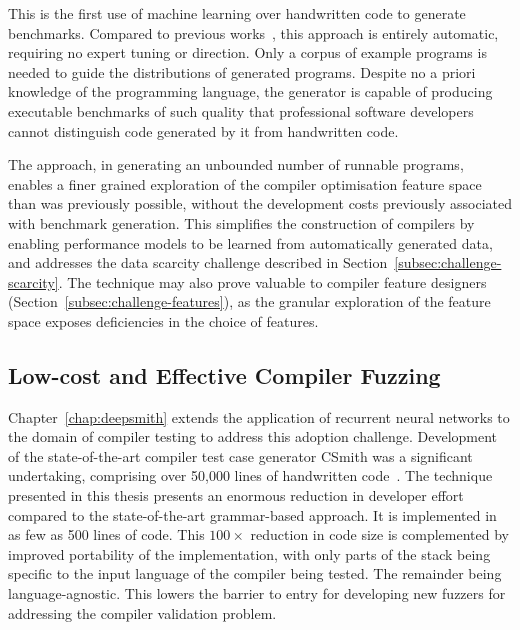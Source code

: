 This is the first use of machine learning over handwritten code to generate benchmarks. Compared to previous works~\cite{Chiu2015}, this approach is entirely automatic, requiring no expert tuning or direction. Only a corpus of example programs is needed to guide the distributions of generated programs. Despite no a priori knowledge of the programming language, the generator is capable of producing executable benchmarks of such quality that professional software developers cannot distinguish code generated by it from handwritten code.

The approach, in generating an unbounded number of runnable programs, enables a finer grained exploration of the compiler optimisation feature space than was previously possible, without the development costs previously associated with benchmark generation. This simplifies the construction of compilers by enabling performance models to be learned from automatically generated data, and addresses the data scarcity challenge described in Section~\ref{subsec:challenge-scarcity}. The technique may also prove valuable to compiler feature designers (Section~\ref{subsec:challenge-features}), as the granular exploration of the feature space exposes deficiencies in the choice of features.



\subsection{Low-cost and Effective Compiler Fuzzing}

 Chapter~\ref{chap:deepsmith} extends the application of recurrent neural networks to the domain of compiler testing to address this adoption challenge. Development of the state-of-the-art compiler test case generator CSmith was a significant undertaking, comprising over 50,000 lines of handwritten code~\cite{Yang2011,Lidbury2015a}. The technique presented in this thesis presents an enormous reduction in developer effort compared to the state-of-the-art grammar-based approach. It is implemented in as few as 500 lines of code. This $100\times$ reduction in code size is complemented by improved portability of the implementation, with only parts of the stack being specific to the input language of the compiler being tested. The remainder being language-agnostic. This lowers the barrier to entry for developing new fuzzers for addressing the compiler validation problem.

